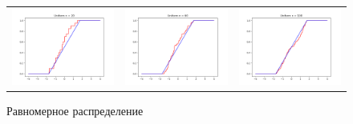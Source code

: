 	\begin{figure}[H]
		\centering
		\begin{tabular}{ccc}
			\includegraphics[width=55mm, height =0.25\textheight]{pics/emp_u_20.png}
			&
			\includegraphics[width=55mm, height =0.25\textheight]{pics/emp_u_60.png}
			&
			\includegraphics[width=55mm, height =0.25\textheight]{pics/emp_u_100.png}
		\end{tabular}
		\caption{Равномерное распределение}
		\label{fig:uniform}
	\end{figure}

